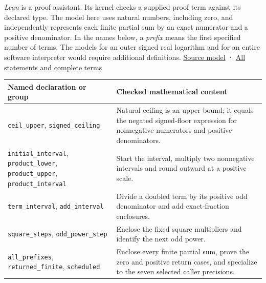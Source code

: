 \emph{Lean} is a proof assistant. Its kernel checks a supplied proof term against its declared type. The model here uses natural numbers, including zero, and independently represents each finite partial sum by an exact numerator and a positive denominator. In the names below, a \emph{prefix} means the first specified number of terms. The models for an outer signed real logarithm and for an entire software interpreter would require additional definitions. \href{https://github.com/sepahead/pid-rs/blob/main/audit/research/signed-log-certificate-enclosure/formal/Model.lean}{Source model} · \href{https://github.com/sepahead/pid-rs/blob/main/audit/research/signed-log-certificate-enclosure/formal/observed/terms.txt}{All statements and complete terms}

{\def\LTcaptype{none} %
\begin{longtable}[]{@{}
  >{\raggedright\arraybackslash}p{}
  >{\raggedright\arraybackslash}p{}@{}}
\toprule\noalign{}
\begin{minipage}[b]{\linewidth}\raggedright
Named declaration or group
\end{minipage} & \begin{minipage}[b]{\linewidth}\raggedright
Checked mathematical content
\end{minipage} \\
\midrule\noalign{}
\endhead
\bottomrule\noalign{}
\endlastfoot
\texttt{ceil\_upper}, \texttt{signed\_ceiling} & Natural ceiling is an upper bound; it equals the negated signed-floor expression for nonnegative numerators and positive denominators. \\
\texttt{initial\_interval}, \texttt{product\_lower}, \texttt{product\_upper}, \texttt{product\_interval} & Start the interval, multiply two nonnegative intervals and round outward at a positive scale. \\
\texttt{term\_interval}, \texttt{add\_interval} & Divide a doubled term by its positive odd denominator and add exact-fraction enclosures. \\
\texttt{square\_steps}, \texttt{odd\_power\_step} & Enclose the fixed square multipliers and identify the next odd power. \\
\texttt{all\_prefixes}, \texttt{returned\_finite}, \texttt{scheduled} & Enclose every finite partial sum, prove the zero and positive return cases, and specialize to the seven selected caller precisions. \\
\end{longtable}
}

